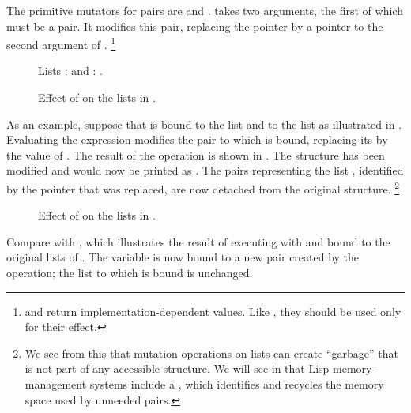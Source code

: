 The primitive mutators for pairs are  and .
 takes two arguments, the first of which must be a pair.
It modifies this pair, replacing the  pointer by a pointer to the second argument of .%
\footnote{
	 and  return implementation-dependent values.
	Like , they should be used only for their effect.
}

\begin{figure}[tp]
	\centering
	
	\caption{
		Lists :  and : .
	}
	\label{Figure 3.12}
\end{figure}

\begin{figure}[bp]
	\centering
	
	\caption{
		Effect of  on the lists in .
	}
	\label{Figure 3.13}
\end{figure}

As an example, suppose that  is bound to the list  and  to the list  as illustrated in .
Evaluating the expression  modifies the pair to which  is bound, replacing its  by the value of .
The result of the operation is shown in .
The structure  has been modified and would now be printed as .
The pairs representing the list , identified by the pointer that was replaced, are now detached from the original structure.%
\footnote{
	We see from this that mutation operations on lists can create “garbage” that is not part of any accessible structure.
	We will see in  that Lisp memory-management systems include a , which identifies and recycles the memory space used by unneeded pairs.
}

\begin{figure}[tp]
	\centering
	
	\caption{
		Effect of  on the lists in .
	}
	\label{Figure 3.14}
\end{figure}

Compare  with , which illustrates the result of executing  with  and  bound to the original lists of .
The variable  is now bound to a new pair created by the  operation;
the list to which  is bound is unchanged.

